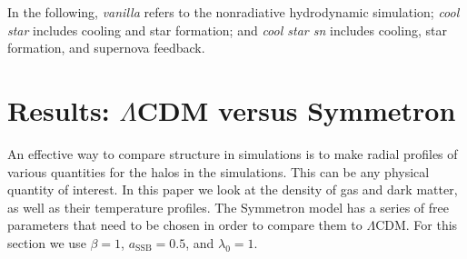 \documentclass{aa}
\begin{document}
In the following, \textit{vanilla} refers to the nonradiative hydrodynamic simulation; \textit{cool star} includes cooling and star formation; and \textit{cool star sn} includes cooling, star formation, and supernova feedback.



\section{Results: $\Lambda$CDM versus Symmetron}\label{sec:LcdmSymAonly}
An effective way to compare structure in simulations is to make radial profiles of various quantities for the halos in the simulations. This can be any physical quantity of interest. In this paper we look at the density of gas and dark matter, as well as their temperature profiles. The Symmetron model has a series of free parameters that need to be chosen in order to compare them to $\Lambda$CDM. For this section we use $\beta = 1$, $a_{\mathrm{SSB}} = 0.5$, and $\lambda_0  = 1$.
\end{document}
